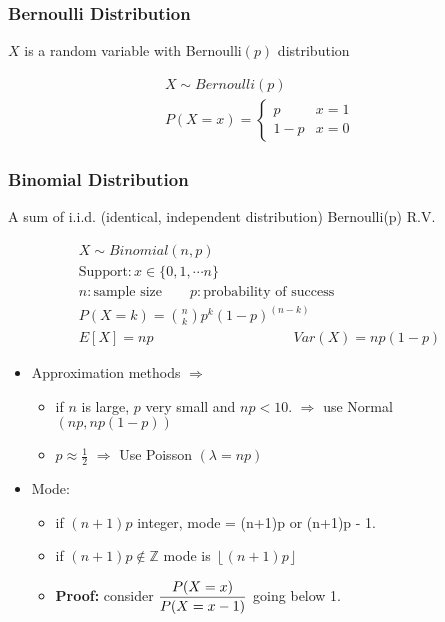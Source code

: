 \subsubsection*{Bernoulli Distribution}
$X$ is a random variable with Bernoulli$(p)$ distribution
\begin{tcolorbox}
\begin{gather*}
X \sim Bernoulli(p)\\
	P(X = x) = \begin{cases}
		p & x=1\\
		1-p & x = 0
	\end{cases}
\end{gather*}
\end{tcolorbox}
\subsubsection*{Binomial Distribution}
A sum of i.i.d. (identical, independent distribution) Bernoulli(p) R.V.
\begin{tcolorbox}
\begin{gather*}
	X \sim Binomial(n,p)\\ 
	\text{Support}: x \in \{0, 1, \cdots n\} \\
	n: \text{sample size}\qquad 
	p: \text{probability of success}\\
	P(X = k) = \binom{n}{k} p^k (1-p)^{(n-k)}\\
	E[X] = np \hspace{10em} Var(X) = np(1-p)
\end{gather*}
\end{tcolorbox}
\begin{itemize}
	\item Approximation methods $\Rightarrow$ 
	\begin{itemize}[label={--}]
		\item if $n$ is large, $p$ very small and $np < 10$. $\Rightarrow$ use Normal $(np, np(1-p))$
		\item $p \approx \frac{1}{2}$ $\Rightarrow$ Use Poisson $(\lambda = np)$
	\end{itemize}
	\item Mode: 
	\begin{itemize}[label={--}]
		\item if $(n+1)p$ integer, mode = (n+1)p or (n+1)p - 1.
		\item if $(n+1)p \notin \mathbb{Z}$ mode is $\left \lfloor{(n+1)p}\right \rfloor$
		\item \textbf{Proof:} consider $\mathlarger{\frac{P(X=x)}{P(X=x-1)}}$ going below 1.
	\end{itemize}
\end{itemize}
